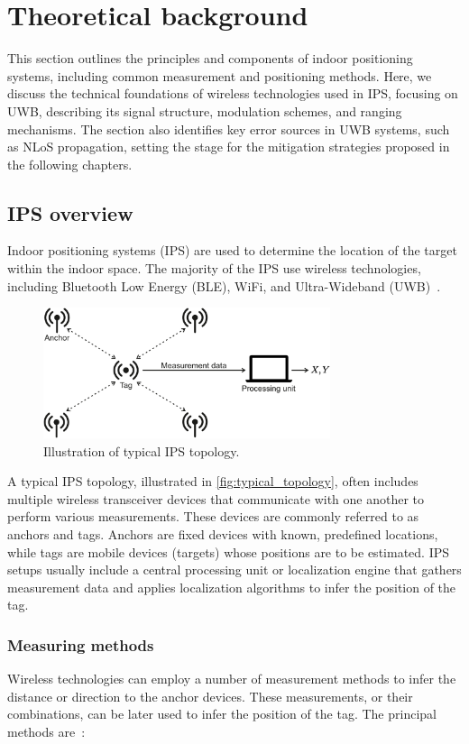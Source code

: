 \chapter{Theoretical background}
This section outlines the principles and components of indoor positioning systems, including common measurement and positioning methods. Here, we discuss the technical foundations of wireless technologies used in IPS, focusing on UWB, describing its signal structure, modulation schemes, and ranging mechanisms. The section also identifies key error sources in UWB systems, such as NLoS propagation, setting the stage for the mitigation strategies proposed in the following chapters.

\section{IPS overview}
Indoor positioning systems (IPS) are used to determine the location of the target within the indoor space. The majority of the IPS use wireless technologies, including Bluetooth Low Energy (BLE), WiFi, and Ultra-Wideband (UWB)~\cite{singh2024systematic}. 

\begin{figure}[tbh]
\includegraphics[width=0.75\textwidth]{Graphics/ips_topology.pdf}
\centering
\caption{Illustration of typical IPS topology.}
\label{fig:typical_topology}
\end{figure}

A typical IPS topology, illustrated in \autoref{fig:typical_topology}, often includes multiple wireless transceiver devices that communicate with one another to perform various measurements. These devices are commonly referred to as anchors and tags. Anchors are fixed devices with known, predefined locations, while tags are mobile devices (targets) whose positions are to be estimated. IPS setups usually include a central processing unit or localization engine that gathers measurement data and applies localization algorithms to infer the position of the tag.

\subsection{Measuring methods}
Wireless technologies can employ a number of measurement methods to infer the distance or direction to the anchor devices. These measurements, or their combinations, can be later used to infer the position of the tag. The principal methods are~\cite{mazhar2017precise}:

